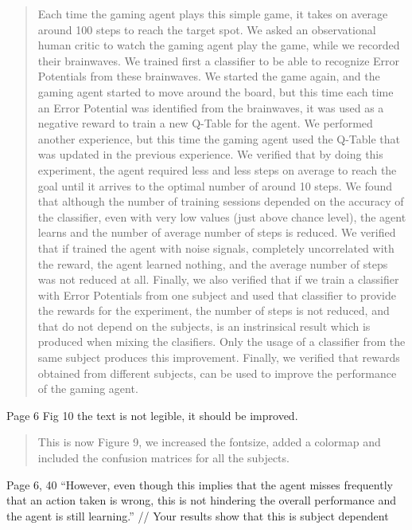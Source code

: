 \documentclass[journal,onecolumn,12pt]{IEEEtran}
\begin{document}
\begin{quotation}
{\color{blue}
Each time the gaming agent plays this simple game, it takes on average around 100 steps to reach the target spot.   We asked an observational human critic to watch the gaming agent play the game, while we recorded their brainwaves.  We trained first a classifier to be able to recognize Error Potentials from these brainwaves.  We started the game again, and the gaming agent started to move around the board, but this time each time an Error Potential was identified from the brainwaves, it was used as a negative reward to train a new Q-Table for the agent.  We performed another experience, but this time the gaming agent used the Q-Table that was updated in the previous experience.
We verified that by doing this experiment, the agent required less and less steps on average to reach the goal until it arrives to the optimal number of around 10 steps.  We found that although the number of training sessions depended on the accuracy of the classifier, even with very low values (just above chance level), the agent learns and the number of average number of steps is reduced.
We verified that if trained the agent with noise signals, completely uncorrelated with the reward, the agent learned nothing, and the average number of steps was not reduced at all.
Finally, we also verified that if we train a classifier with Error Potentials from one subject and used that classifier to provide the rewards for the experiment, the number of steps is not reduced, and that do not depend on the subjects, is an instrinsical result which is produced when mixing the clasifiers.  Only the usage of a classifier from the same subject produces this improvement.
Finally, we verified that rewards obtained from different subjects, can be used to improve the performance of the gaming agent.
}
\end{quotation}

Page 6 Fig 10 the text is not legible, it should be improved.

\begin{quotation}
{\color{blue}
This is now Figure 9, we increased the fontsize, added a colormap and included the confusion matrices for all the subjects.
}
\end{quotation}

Page 6, 40
“However, even though this implies that the agent misses frequently that an action taken is wrong, this is not hindering the overall performance and the agent is still learning.”
// Your results show that this is subject dependent
\end{document}
